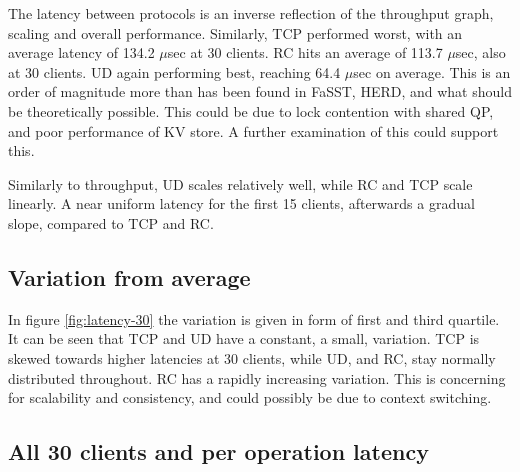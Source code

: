 The latency between protocols is an inverse reflection of the throughput graph, scaling and overall performance.
Similarly, TCP performed worst, with an average latency of 134.2 $\mu$sec at 30 clients.
RC hits an average of 113.7 $\mu$sec, also at 30 clients.
UD again performing best, reaching 64.4 $\mu$sec on average.
This is an order of magnitude more than has been found in FaSST\cite{kalia2016fasst}, HERD\cite{kalia2014using}, and what should be theoretically possible.
This could be due to lock contention with shared QP, and poor performance of KV store.
A further examination of this could support this.

Similarly to throughput, UD scales relatively well, while RC and TCP scale linearly.
A near uniform latency for the first 15 clients, afterwards a gradual slope, compared to TCP and RC.

\subsection{Variation from average}
In figure \ref{fig:latency-30} the variation is given in form of first and third quartile.
It can be seen that TCP and UD have a constant, a small, variation.
TCP is skewed towards higher latencies at 30 clients, while UD, and RC, stay normally distributed throughout.
RC has a rapidly increasing variation.
This is concerning for scalability and consistency, and could possibly be due to context switching.

\subsection{All 30 clients and per operation latency}\label{subsec:all-30-clients-and-per-operation-latency}

